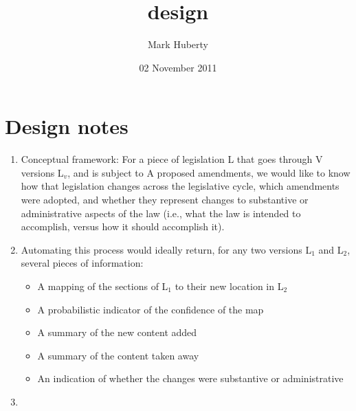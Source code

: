 \documentclass[11pt]{article}
\title{design}
\author{Mark Huberty}
\date{02 November 2011}
\begin{document}
\maketitle

\setcounter{tocdepth}{3}
\tableofcontents
\vspace*{1cm}
\section{Design notes}
\label{sec-1}

\begin{enumerate}
\item Conceptual framework:
   For a piece of legislation L that goes through V versions L$_v$, and is
   subject to A proposed amendments, we would like to know how that
   legislation changes across the legislative cycle, which amendments
   were adopted, and whether they represent changes to substantive or
   administrative aspects of the law (i.e., what the law is intended
   to accomplish, versus how it should accomplish it).
\item Automating this process would ideally return, for any two versions
   L$_1$ and L$_2$, several pieces of information:

\begin{itemize}
\item A mapping of the sections of L$_1$ to their new location in L$_2$
\item A probabilistic indicator of the confidence of the map
\item A summary of the new content added
\item A summary of the content taken away
\item An indication of whether the changes were substantive or
     administrative
\end{itemize}

\item 
\end{enumerate}

   
\end{document}
